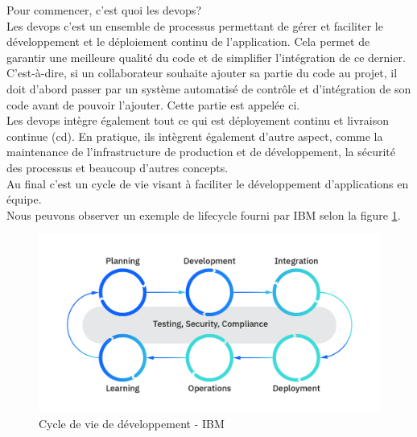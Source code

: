 \documentclass[
    iai, %
    il, %
]{heig-tb}
\begin{document}
Pour commencer, c'est quoi les \Gls{devops}?\\
Les \Gls{devops} c'est un ensemble de processus permettant de gérer et faciliter le développement et le déploiement continu de l'application. Cela permet de garantir une meilleure qualité du code et de simplifier l'intégration de ce dernier. C'est-à-dire, si un collaborateur souhaite ajouter sa partie du code au projet, il doit d'abord passer par un système automatisé de contrôle et d'intégration de son code avant de pouvoir l'ajouter. Cette partie est appelée \Gls{ci}.\\
Les \Gls{devops} intègre également tout ce qui est déployement continu et livraison continue (\Gls{cd}).
En pratique, ils intègrent également d'autre aspect, comme la maintenance de l'infrastructure de
production et de développement, la sécurité des processus et beaucoup d'autres concepts.\\
Au final c'est un cycle de vie visant à faciliter le développement d'applications en équipe.\\
Nous peuvons observer un exemple de lifecycle fourni par IBM selon la figure \ref{devops-lifecycle}.

\begin{center}
    \begin{figure}
        \includegraphics[width=\textwidth]{./assets/figures/ibm-devops-lifecycle.png}
        \caption[Cycle de vie de développement]{Cycle de vie de développement - IBM} \label{devops-lifecycle}
    \end{figure}
\end{center}
\end{document}
